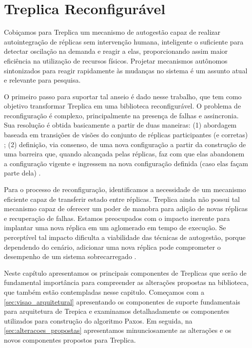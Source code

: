 \chapter{Treplica Reconfigurável}\label{cap2}

Cobiçamos para Treplica um mecanismo de autogestão capaz de realizar autointegração de
réplicas sem intervenção humana, inteligente o suficiente para detectar oscilação na
demanda e reagir a elas, proporcionando assim maior eficiência na utilização de recursos
físicos. Projetar mecanismos autônomos sintonizados para reagir rapidamente às mudanças no
sistema é um assunto atual e relevante para pesquisa.

O primeiro passo para suportar tal anseio é dado nesse trabalho, que tem como objetivo
transformar Treplica em uma biblioteca reconfigurável. O problema de reconfiguração é
complexo, principalmente na presença de falhas e assincronia. Sua resolução é obtida
basicamente a partir de duas maneiras: (1) abordagem baseada em transições de visões do
conjunto de réplicas participantes (e corretas) \cite{birman87a, birman87b}; (2)
definição, via consenso, de uma nova configuração a partir da construção de uma barreira
que, quando alcançada pelas réplicas, faz com que elas abandonem a configuração vigente e
ingressem na nova configuração definida (caso elas façam parte dela) \cite{lamport10}.

Para o processo de reconfiguração, identificamos a necessidade de um mecanismo eficiente
capaz de transferir estado entre réplicas. Treplica ainda não possui tal mecanismo capaz
de oferecer um poder de manobra para adição de novas réplicas e recuperação de falhas.
Estamos preocupados com o impacto inerente para implantar uma nova réplica em um
aglomerado em tempo de execução. Se perceptível tal impacto dificulta a viabilidade das
técnicas de autogestão, porque dependendo do cenário, adicionar uma nova réplica pode
comprometer o desempenho de um sistema sobrecarregado \cite{vilaca09}.

Neste capítulo apresentamos os principais componentes de Treplicas que serão de
fundamental importância para compreender as alterações propostas na biblioteca, que também
estão contempladas nesse capitulo. Começamos com a \autoref{sec:visao_arquitetural}
apresentando os componentes de suporte fundamentais para arquitetura de Trepica e
examinamos detalhadamente os componentes utilizados para construção do algoritmo Paxos. Em
seguida, na \autoref{sec:alteracoes_propostas} apresentamos minunciosamente as alterações
e os novos componentes propostos para Treplica.


